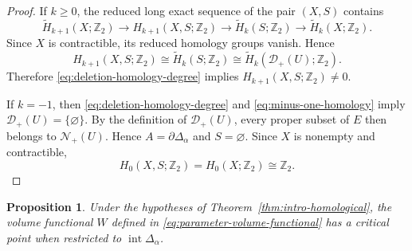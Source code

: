 \documentclass[12pt,reqno]{amsart}
\numberwithin{equation}{section}
\newtheorem{proposition}[theorem]{Proposition}
\theoremstyle{remark}
\newcommand{\Ncal}{\mathcal N}
\newcommand{\Dcal}{\mathcal D}
\begin{document}
\begin{proof}
If \(k\geq0\), the reduced long exact sequence of the pair
\((X,S)\) contains
\[
\widetilde H_{k+1}(X;\mathbb Z_2)
\longrightarrow
H_{k+1}(X,S;\mathbb Z_2)
\longrightarrow
\widetilde H_k(S;\mathbb Z_2)
\longrightarrow
\widetilde H_k(X;\mathbb Z_2).
\]
Since \(X\) is contractible, its reduced homology groups vanish.
Hence
\[
H_{k+1}(X,S;\mathbb Z_2)
\cong
\widetilde H_k(S;\mathbb Z_2)\cong
\widetilde H_k(\Dcal_+(U);\mathbb Z_2).
\]
Therefore \eqref{eq:deletion-homology-degree} implies
\(H_{k+1}(X,S;\mathbb Z_2)\neq0\).
	
	
	
	If \(k=-1\), then \eqref{eq:deletion-homology-degree} and
	\eqref{eq:minus-one-homology} imply
	\(\Dcal_+(U)=\{\varnothing\}\). By the definition of
	\(\Dcal_+(U)\), every proper subset of \(E\) then belongs to
	\(\Ncal_+(U)\). Hence
	\(A=\partial\Delta_\alpha\) and \(S=\varnothing\). Since \(X\) is
	nonempty and contractible,
	\[
	H_0(X,S;\mathbb Z_2)
	=
	H_0(X;\mathbb Z_2)
	\cong
	\mathbb Z_2.
	\]
\end{proof}

\begin{proposition}\label{prop:interior-critical-point}
	Under the hypotheses of Theorem~\ref{thm:intro-homological}, the
	volume functional \(W\) defined in \eqref{eq:parameter-volume-functional} has a
	critical point when restricted to
	\(\operatorname{int}\Delta_\alpha\).
\end{proposition}
\end{document}
